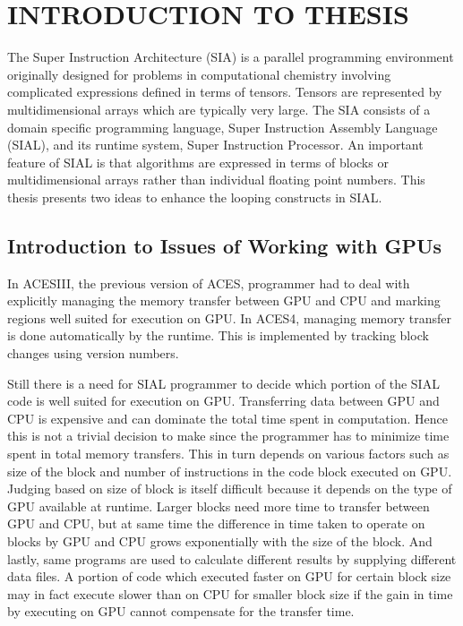 \chapter{INTRODUCTION TO THESIS}\label{intro}
The Super Instruction Architecture (SIA) is a parallel programming environment
originally designed for problems in computational chemistry involving complicated
expressions defined in terms of tensors. Tensors are represented by
multidimensional arrays which are typically very large. The SIA consists of a
domain specific programming language, Super Instruction Assembly Language
(SIAL), and its runtime system, Super Instruction Processor. An important
feature of SIAL is that algorithms are expressed in terms of blocks or
multidimensional arrays rather than individual floating point numbers. This thesis
presents two ideas to enhance the looping constructs in SIAL.

\section{Introduction to Issues of Working with GPUs}
In ACESIII, the previous version of ACES, programmer had to deal with explicitly managing
the memory transfer between GPU and CPU and marking regions well suited for execution
on GPU. In ACES4, managing memory transfer is done automatically by the runtime.
This is implemented by tracking block changes using version numbers.

Still there is a need for SIAL programmer to decide which portion of the SIAL code
is well suited for execution on GPU. Transferring data between GPU and CPU is
expensive and can dominate the total time spent in computation. Hence this is not
a trivial decision to make since the programmer has to minimize time spent in
total memory transfers. This in turn depends on various factors such as
size of the block and number of instructions in the code block executed on GPU. Judging
based on size of block is itself difficult because it depends on the type of GPU available
at runtime. Larger blocks need more time to transfer between GPU and CPU, but at
same time the difference in time taken to operate on blocks by GPU and CPU grows
exponentially with the size of the block. And lastly, same programs are used to
calculate different results by supplying different data files. A portion of code
which executed faster on GPU for certain block size may in fact execute slower
than on CPU for smaller block size if the gain in time by executing on GPU cannot
compensate for the transfer time.

